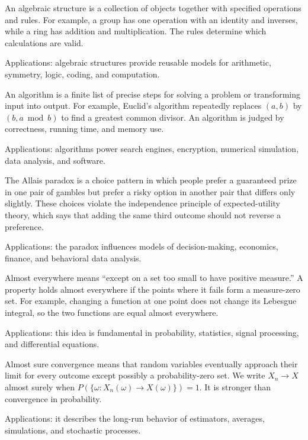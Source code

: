 An algebraic structure is a collection of objects together with specified operations and rules. For example, a group has one operation with an identity and inverses, while a ring has addition and multiplication. The rules determine which calculations are valid. \par\noindent Applications: algebraic structures provide reusable models for arithmetic, symmetry, logic, coding, and computation.

An algorithm is a finite list of precise steps for solving a problem or transforming input into output. For example, Euclid's algorithm repeatedly replaces $(a,b)$ by $(b,a\bmod b)$ to find a greatest common divisor. An algorithm is judged by correctness, running time, and memory use. \par\noindent Applications: algorithms power search engines, encryption, numerical simulation, data analysis, and software.

The Allais paradox is a choice pattern in which people prefer a guaranteed prize in one pair of gambles but prefer a risky option in another pair that differs only slightly. These choices violate the independence principle of expected-utility theory, which says that adding the same third outcome should not reverse a preference. \par\noindent Applications: the paradox influences models of decision-making, economics, finance, and behavioral data analysis.

Almost everywhere means “except on a set too small to have positive measure.” A property holds almost everywhere if the points where it fails form a measure-zero set. For example, changing a function at one point does not change its Lebesgue integral, so the two functions are equal almost everywhere. \par\noindent Applications: this idea is fundamental in probability, statistics, signal processing, and differential equations.

Almost sure convergence means that random variables eventually approach their limit for every outcome except possibly a probability-zero set. We write $X_n\to X$ almost surely when $P(\{\omega:X_n(\omega)\to X(\omega)\})=1$. It is stronger than convergence in probability. \par\noindent Applications: it describes the long-run behavior of estimators, averages, simulations, and stochastic processes.

